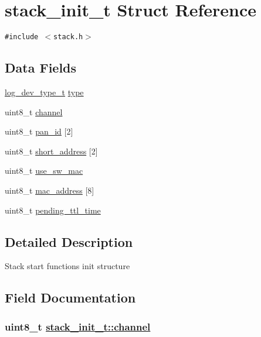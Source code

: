\hypertarget{structstack__init__t}{
\section{stack\_\-init\_\-t Struct Reference}
\label{structstack__init__t}
}
{\tt \#include $<$stack.h$>$}

\subsection*{Data Fields}
\begin{CompactItemize}
\item 
\hyperlink{stack_8h_2af35922006e25ad6270937397391c79}{log\_\-dev\_\-type\_\-t} \hyperlink{structstack__init__t_6ac3dd68e3b2e8d832bd4783621dd4e6}{type}
\item 
uint8\_\-t \hyperlink{structstack__init__t_8c9d5d500e1c3cabe2d2b5950d09c39d}{channel}
\item 
uint8\_\-t \hyperlink{structstack__init__t_0b3e8601ce7872c7f84e6cca0578df99}{pan\_\-id} \mbox{[}2\mbox{]}
\item 
uint8\_\-t \hyperlink{structstack__init__t_05a9f2e4bedbe10b126a776c42e00194}{short\_\-address} \mbox{[}2\mbox{]}
\item 
uint8\_\-t \hyperlink{structstack__init__t_f2ce0b6ca35ce13964f9bfe6b728f68a}{use\_\-sw\_\-mac}
\item 
uint8\_\-t \hyperlink{structstack__init__t_e19c2be8fe2556624797d574f870626d}{mac\_\-address} \mbox{[}8\mbox{]}
\item 
uint8\_\-t \hyperlink{structstack__init__t_2b6a33578db7e0963d6c33431dd19c1d}{pending\_\-ttl\_\-time}
\end{CompactItemize}


\subsection{Detailed Description}
Stack start functions init structure 



\subsection{Field Documentation}
\hypertarget{structstack__init__t_8c9d5d500e1c3cabe2d2b5950d09c39d}{
\subsubsection[channel]{\setlength{\rightskip}{0pt plus 5cm}uint8\_\-t \hyperlink{structstack__init__t_8c9d5d500e1c3cabe2d2b5950d09c39d}{stack\_\-init\_\-t::channel}}}
\label{structstack__init__t_8c9d5d500e1c3cabe2d2b5950d09c39d}



